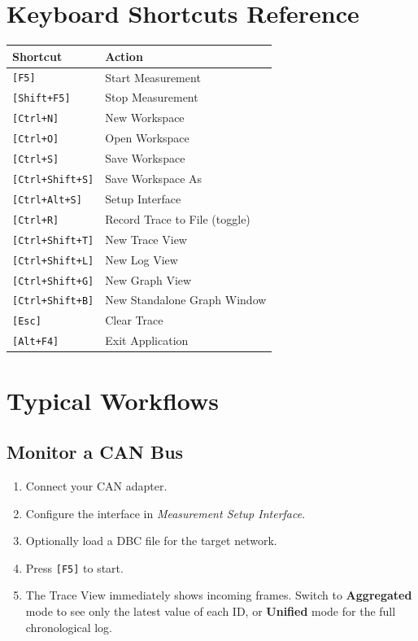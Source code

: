 \documentclass[a4paper,11pt]{article}
\newcommand{\key}[1]{\texttt{\small[#1]}}
\newcommand{\menu}[1]{\textit{#1}}
\newcommand{\ui}[1]{\textbf{#1}}
\begin{document}
\section{Keyboard Shortcuts Reference}

\begin{longtable}{p{4.5cm} p{8.5cm}}
  \toprule
  \textbf{Shortcut} & \textbf{Action} \\
  \midrule
  \endhead
  \key{F5}               & Start Measurement \\
  \key{Shift+F5}         & Stop Measurement \\
  \key{Ctrl+N}           & New Workspace \\
  \key{Ctrl+O}           & Open Workspace \\
  \key{Ctrl+S}           & Save Workspace \\
  \key{Ctrl+Shift+S}     & Save Workspace As \\
  \key{Ctrl+Alt+S}       & Setup Interface \\
  \key{Ctrl+R}           & Record Trace to File (toggle) \\
  \key{Ctrl+Shift+T}     & New Trace View \\
  \key{Ctrl+Shift+L}     & New Log View \\
  \key{Ctrl+Shift+G}     & New Graph View \\
  \key{Ctrl+Shift+B}     & New Standalone Graph Window \\
  \key{Esc}              & Clear Trace \\
  \key{Alt+F4}           & Exit Application \\
  \bottomrule
\end{longtable}

\section{Typical Workflows}

\subsection{Monitor a CAN Bus}

\begin{enumerate}
  \item Connect your CAN adapter.
  \item Configure the interface in \menu{Measurement \textrightarrow{} Setup Interface}.
  \item Optionally load a DBC file for the target network.
  \item Press \key{F5} to start.
  \item The Trace View immediately shows incoming frames. Switch to
        \ui{Aggregated} mode to see only the latest value of each ID,
        or \ui{Unified} mode for the full chronological log.
\end{enumerate}
\end{document}
